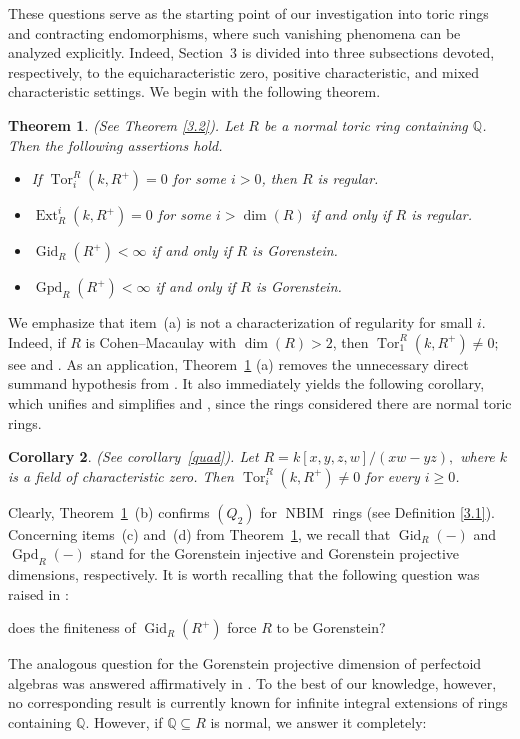 \documentclass[12pt,reqno]{amsart}
\newtheorem{theorem}{Theorem}[section]
\newtheorem{corollary}[theorem]{Corollary}
\theoremstyle{definition}
\theoremstyle{remark}
\theoremstyle{cited}
\theoremstyle{remark}
\theoremstyle{citeddef}
\DeclareMathOperator{\Ext}{Ext}
\DeclareMathOperator{\Tor}{Tor}
\DeclareMathOperator{\NBIM}{NBIM}
\begin{document}
	These questions serve as the starting point of our investigation into toric rings and contracting endomorphisms, where such vanishing phenomena can be analyzed explicitly.
	Indeed, Section~3 is divided into three subsections devoted, respectively, to the equicharacteristic zero, positive characteristic, and mixed characteristic settings. We begin with the following theorem.
	
	\begin{theorem}\label{main1}(See Theorem \ref{3.2}).
		Let \(R\) be a normal toric ring containing \(\mathbb{Q}\). Then the following assertions hold.
		\begin{itemize}
			\item[(a)] If \(\Tor_i^R(k,R^+)=0\) for some \(i>0\), then \(R\) is regular.
			
			\item[(b)] \(\Ext_R^i(k,R^+)=0\) for some \(i>\dim(R)\) if and only if \(R\) is regular.
			
			\item[(c)] \(\operatorname{Gid}_R(R^+)<\infty\) if and only if \(R\) is Gorenstein.
			
			\item[(d)] \(\operatorname{Gpd}_R(R^+)<\infty\) if and only if \(R\) is Gorenstein.
		\end{itemize}
	\end{theorem}
	
	We emphasize that item~(a) is not a characterization of regularity for small $i$. Indeed, if \(R\) is Cohen--Macaulay with \(\dim(R)>2\), then
	\(
	\Tor_1^R(k,R^+)\neq 0;
	\)
	see \cite[Theorem~3.2]{Shravan} and \cite[Theorem~1.2~(c)]{Elham}.
	As an application, Theorem~\ref{main1} (a) removes the unnecessary direct summand hypothesis from \cite[Observation~5.7 (iii)]{Elham}. It also immediately yields the following corollary, which unifies and simplifies \cite[Proposition~5.6]{Elham} and \cite[Proposition~2.1]{RSS}, since the rings considered there are normal toric rings.
	
	\begin{corollary}(See corollary~\ref{quad}).
		Let
		\(
		R=k[x,y,z,w]/(xw-yz),
		\)
		where \(k\) is a field of characteristic zero. Then
		\(
		\Tor_i^R(k,R^+)\neq0
		\)
		for every \(i\ge0\).
	\end{corollary}
	Clearly, Theorem~\ref{main1}~(b) confirms $(Q_2)$ for $\NBIM$ rings (see Definition \ref{3.1}).
	Concerning items~(c) and~(d) from Theorem~\ref{main1}, we recall that \(\operatorname{Gid}_R(-)\) and \(\operatorname{Gpd}_R(-)\) stand for the Gorenstein injective and Gorenstein projective dimensions, respectively.
	It is worth recalling that the following question was raised in \cite[Question 6.7]{Asg26}: \begin{center}does the finiteness of
		\(
		\operatorname{Gid}_R(R^+)
		\)
		force \(R\) to be Gorenstein?\end{center} The analogous question for the Gorenstein projective dimension of perfectoid algebras was answered affirmatively in \cite[Corollary 3.4]{Ryo}. To the best of our knowledge, however, no corresponding result is currently known for infinite integral extensions of rings containing \(\mathbb{Q}\).
	However, if $\mathbb{Q}\subseteq R$ is normal, we answer it completely:
	
\end{document}
